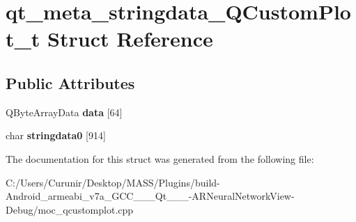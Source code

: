 \hypertarget{structqt__meta__stringdata___q_custom_plot__t}{}\section{qt\+\_\+meta\+\_\+stringdata\+\_\+\+Q\+Custom\+Plot\+\_\+t Struct Reference}
\label{structqt__meta__stringdata___q_custom_plot__t}
\subsection*{Public Attributes}
\begin{DoxyCompactItemize}
\item 
\mbox{\label{structqt__meta__stringdata___q_custom_plot__t_a6b3542d50d756926ac333666b43bca7e}} 
Q\+Byte\+Array\+Data {\bfseries data} \mbox{[}64\mbox{]}
\item 
\mbox{\label{structqt__meta__stringdata___q_custom_plot__t_a36e06ef213a3b873e72d77691aaf66d7}} 
char {\bfseries stringdata0} \mbox{[}914\mbox{]}
\end{DoxyCompactItemize}


The documentation for this struct was generated from the following file\+:\begin{DoxyCompactItemize}
\item 
C\+:/\+Users/\+Curunir/\+Desktop/\+M\+A\+S\+S/\+Plugins/build-\/\+Android\+\_\+armeabi\+\_\+v7a\+\_\+\+G\+C\+C\+\_\+\_\+\_\+\+Qt\+\_\+\_\+\_-\/\+A\+R\+Neural\+Network\+View-\/\+Debug/moc\+\_\+qcustomplot.\+cpp\end{DoxyCompactItemize}
